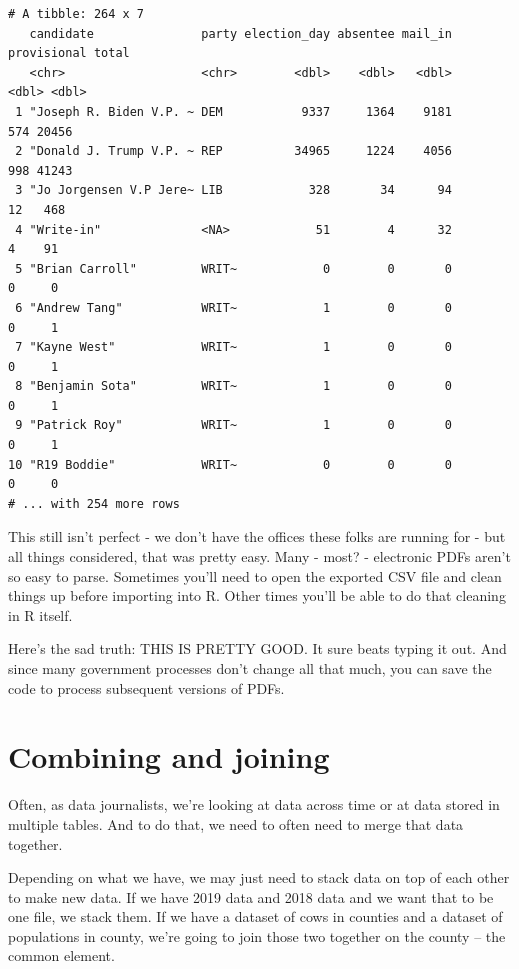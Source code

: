 \documentclass[
  letterpaper,
  DIV=11,
  numbers=noendperiod]{scrreprt}
\begin{document}
\begin{verbatim}
# A tibble: 264 x 7
   candidate               party election_day absentee mail_in provisional total
   <chr>                   <chr>        <dbl>    <dbl>   <dbl>       <dbl> <dbl>
 1 "Joseph R. Biden V.P. ~ DEM           9337     1364    9181         574 20456
 2 "Donald J. Trump V.P. ~ REP          34965     1224    4056         998 41243
 3 "Jo Jorgensen V.P Jere~ LIB            328       34      94          12   468
 4 "Write-in"              <NA>            51        4      32           4    91
 5 "Brian Carroll"         WRIT~            0        0       0           0     0
 6 "Andrew Tang"           WRIT~            1        0       0           0     1
 7 "Kayne West"            WRIT~            1        0       0           0     1
 8 "Benjamin Sota"         WRIT~            1        0       0           0     1
 9 "Patrick Roy"           WRIT~            1        0       0           0     1
10 "R19 Boddie"            WRIT~            0        0       0           0     0
# ... with 254 more rows
\end{verbatim}

This still isn't perfect - we don't have the offices these folks are
running for - but all things considered, that was pretty easy. Many -
most? - electronic PDFs aren't so easy to parse. Sometimes you'll need
to open the exported CSV file and clean things up before importing into
R. Other times you'll be able to do that cleaning in R itself.

Here's the sad truth: THIS IS PRETTY GOOD. It sure beats typing it out.
And since many government processes don't change all that much, you can
save the code to process subsequent versions of PDFs.


\hypertarget{combining-and-joining}{%
\chapter{Combining and joining}\label{combining-and-joining}}

Often, as data journalists, we're looking at data across time or at data
stored in multiple tables. And to do that, we need to often need to
merge that data together.

Depending on what we have, we may just need to stack data on top of each
other to make new data. If we have 2019 data and 2018 data and we want
that to be one file, we stack them. If we have a dataset of cows in
counties and a dataset of populations in county, we're going to join
those two together on the county -- the common element.
\end{document}
